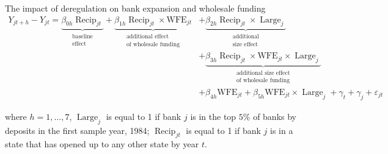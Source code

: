 \documentclass[notes,10pt, aspectratio=169]{beamer}
\begin{document}
\begin{frame}{The impact of deregulation on bank expansion and wholesale funding \hyperlink{der_impact}{}
            }
            $$
            \begin{aligned}
            Y_{j t+h}-Y_{j t}=\underbrace{\beta_{0 h} \operatorname{Recip}_{j t}}_{\begin{array}{c}
            \text { baseline } \\
            \text { effect }
            \end{array}}+\underbrace{\beta_{1 h} \operatorname{Recip}_{j t} \times \mathrm{WFE}_{j t}}_{\begin{array}{c}
            \text { additional effect } \\
            \text { of wholesale funding }
            \end{array}} & +\underbrace{\beta_{2 h} \operatorname{Recip}_{j t} \times \operatorname{Large}_j}_{\begin{array}{c}
            \text { additional } \\
            \text { size effect }
            \end{array}}\\
             & +\underbrace{\beta_{3 h} \operatorname{Recip}_{j t} \times \mathrm{WFE}_{j t} \times \operatorname{Large}_j}_{\begin{array}{c}
            \text { additional size effect } \\
            \text { of wholesale funding }
            \end{array}} \\
            & +\beta_{4 h} \mathrm{WFE}_{j t}+\beta_{5 h} \mathrm{WFE}_{j t} \times \operatorname{Large}_j+\gamma_t+\gamma_j+\varepsilon_{j t}
            \end{aligned}
            $$
    
    
            where  $h=1, \ldots, 7 $, $\operatorname{Large}_j$ is equal to 1 if bank $j$ is in the top $5 \%$ of banks by deposits in the first sample year, 1984; $\operatorname{Recip}_{j t}$ is equal to 1 if bank $j$ is in a state that has opened up to any other state by year $t$. %
            
            \end{frame}
        
\end{document}
